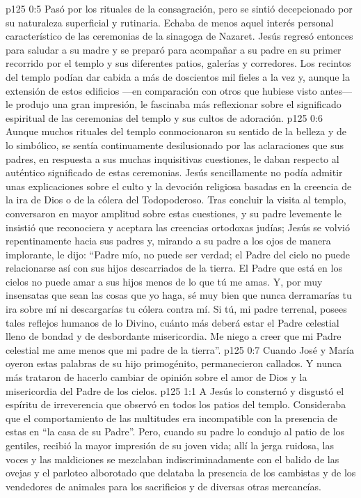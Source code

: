 \vs p125 0:5 Pasó por los rituales de la consagración, pero se sintió decepcionado por su naturaleza superficial y rutinaria. Echaba de menos aquel interés personal característico de las ceremonias de la sinagoga de Nazaret. Jesús regresó entonces para saludar a su madre y se preparó para acompañar a su padre en su primer recorrido por el templo y sus diferentes patios, galerías y corredores. Los recintos del templo podían dar cabida a más de doscientos mil fieles a la vez y, aunque la extensión de estos edificios ---en comparación con otros que hubiese visto antes--- le produjo una gran impresión, le fascinaba más reflexionar sobre el significado espiritual de las ceremonias del templo y sus cultos de adoración.
\vs p125 0:6 Aunque muchos rituales del templo conmocionaron su sentido de la belleza y de lo simbólico, se sentía continuamente desilusionado por las aclaraciones que sus padres, en respuesta a sus muchas inquisitivas cuestiones, le daban respecto al auténtico significado de estas ceremonias. Jesús sencillamente no podía admitir unas explicaciones sobre el culto y la devoción religiosa basadas en la creencia de la ira de Dios o de la cólera del Todopoderoso. Tras concluir la visita al templo, conversaron en mayor amplitud sobre estas cuestiones, y su padre levemente le insistió que reconociera y aceptara las creencias ortodoxas judías; Jesús se volvió repentinamente hacia sus padres y, mirando a su padre a los ojos de manera implorante, le dijo: “Padre mío, no puede ser verdad; el Padre del cielo no puede relacionarse así con sus hijos descarriados de la tierra. El Padre que está en los cielos no puede amar a sus hijos menos de lo que tú me amas. Y, por muy insensatas que sean las cosas que yo haga, sé muy bien que nunca derramarías tu ira sobre mí ni descargarías tu cólera contra mí. Si tú, mi padre terrenal, posees tales reflejos humanos de lo Divino, cuánto más deberá estar el Padre celestial lleno de bondad y de desbordante misericordia. Me niego a creer que mi Padre celestial me ame menos que mi padre de la tierra”.
\vs p125 0:7 Cuando José y María oyeron estas palabras de su hijo primogénito, permanecieron callados. Y nunca más trataron de hacerlo cambiar de opinión sobre el amor de Dios y la misericordia del Padre de los cielos.
\vs p125 1:1 A Jesús lo consternó y disgustó el espíritu de irreverencia que observó en todos los patios del templo. Consideraba que el comportamiento de las multitudes era incompatible con la presencia de estas en “la casa de su Padre”. Pero, cuando su padre lo condujo al patio de los gentiles, recibió la mayor impresión de su joven vida; allí la jerga ruidosa, las voces y las maldiciones se mezclaban indiscriminadamente con el balido de las ovejas y el parloteo alborotado que delataba la presencia de los cambistas y de los vendedores de animales para los sacrificios y de diversas otras mercancías.
